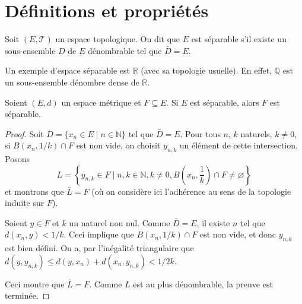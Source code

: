 \section{Définitions et propriétés}
\begin{df}
  Soit $(E, \mathcal T)$ un espace topologique. On dit que $E$ est séparable
  s'il existe un sous-ensemble $D$ de $E$ dénombrable tel que
  $\bar D = E$.
\end{df}

Un exemple d'espace séparable est $\mathbb R$ (avec sa topologie usuelle).
En effet, $\mathbb Q$ est un sous-ensemble dénombre dense de $\mathbb R$.

\begin{prop}\label{sep:ind}
  Soient $(E, d)$ un espace métrique et $F\subseteq E$. Si $E$ est séparable,
  alors $F$ est séparable.
\end{prop}
\begin{proof}
  Soit $D = \{x_n \in E\mid {n\in\mathbb N}\}$ tel que $\bar D = E$.
  Pour tous $n$, $k$ naturels, $k\neq 0$, si
  $B\left(x_n, 1/k\right)\cap F$ est non
  vide, on choisit $y_{n, k}$ un élément de cette intersection. Posons
  $$L = \left\{y_{n, k} \in F\mid n, k\in\mathbb N, k \neq 0,
    B\left(x_n, \frac{1}{k}\right)\cap F\neq \varnothing\right\}$$
  et montrons que $\bar L = F$ (où on considère ici l'adhérence au sens
  de la topologie induite sur $F$).

  Soient $y\in F$ et $k$ un naturel non nul.
  Comme $\bar D = E$, il existe $n$ tel que $d(x_n, y) < 1/k$. Ceci implique
  que $B(x_n, 1/k)\cap F$ est non vide, et donc  $y_{n, k}$ est bien défini.
  On a, par l'inégalité triangulaire que $d(y, y_{n, k}) \leq d(y, x_n) +
  d(x_n, y_{n, k}) < 1/2k$.

  Ceci montre que $\bar L = F$. Comme $L$ est au plus dénombrable,
  la preuve est terminée.
\end{proof}

